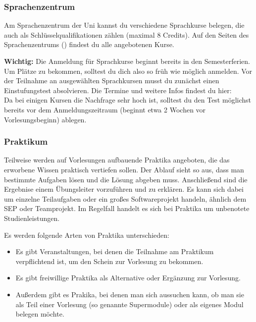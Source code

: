 	\subsubsection{Sprachenzentrum}
	Am Sprachenzentrum der Uni kannst du verschiedene Sprachkurse belegen, die auch als Schlüsselqualifikationen zählen (maximal 8 Credits). Auf den Seiten des Sprachenzentrums () findest du alle angebotenen Kurse.

	\textbf{Wichtig:} Die Anmeldung für Sprachkurse beginnt bereits in den Semesterferien. Um Plätze zu bekommen, solltest du dich also so früh wie möglich anmelden. Vor der Teilnahme an ausgewählten Sprachkursen musst du zunächst einen Einstufungstest absolvieren. Die Termine und weitere Infos findest du hier: \\
	Da bei einigen Kursen die Nachfrage sehr hoch ist, solltest du den Test möglichst bereits vor dem Anmeldungszeitraum (beginnt etwa 2 Wochen vor Vorlesungsbeginn) ablegen.

	\subsubsection{Praktikum}
	Teilweise werden auf Vorlesungen aufbauende Praktika angeboten, die das erworbene Wissen praktisch vertiefen sollen. Der Ablauf sieht so aus, dass man bestimmte Aufgaben lösen und die Lösung abgeben muss. Anschließend sind die Ergebnise einem Übungsleiter vorzuführen und zu erklären. Es kann sich dabei um einzelne Teilaufgaben oder ein großes Softwareprojekt handeln, ähnlich dem SEP oder Teamprojekt. Im Regelfall handelt es sich bei Praktika um unbenotete Studienleistungen.

Es werden folgende	Arten von Praktika unterschieden:
	
	\begin{itemize}
		\item Es gibt Veranstaltungen, bei denen die Teilnahme am Praktikum verpflichtend ist, um den Schein zur Vorlesung zu bekommen. 
		\item Es gibt freiwillige Praktika als Alternative oder Ergänzung zur Vorlesung.
		\item Außerdem gibt es Prakika, bei denen man sich aussuchen kann, ob man sie als Teil einer Vorlesung (so genannte Supermodule) oder als eigenes Modul belegen möchte.
	\end{itemize}

